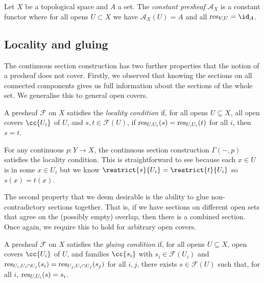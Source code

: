 \documentclass{article}
\begin{document}
\begin{example}
  Let $X$ be a topological space and $A$ a set. The \emph{constant presheaf}
  $\mathscr A_X$ is a constant functor where for all opens $U \subset X$
  we have $\mathscr A_X(U) = A$ and all $\res_{V, U} = \id_A$.
\end{example}

\subsection{Locality and gluing}

The continuous section construction has two further properties that
the notion of a presheaf does not cover. Firstly, we observed that
knowing the sections on all connected components gives us full
information about the sections of the whole set. We generalise this to
general open covers.

\begin{definition}
  A presheaf $\mathscr F$ on $X$ satisfies the \emph{locality condition}
  if, for all opens $U\subseteq X$, all open covers $\cc{U_i}$ of $U$,
  and $s,t\in\mathscr F(U)$, if $\operatorname{res}_{U,U_i}(s) = \operatorname{res}_{U,U_i}(t)$ for all $i$,
  then $s=t$.
\end{definition}

\begin{example}
  For any continuous $p:Y\to X$, the continuous section
  construction $\Gamma(-,p)$ satisfies the locality condition.
  This is straightforward to see because each $x\in U$ is in
  some $x\in U_i$ but we know $\restrict{s}{U_i}=\restrict{t}{U_i}$
  so $s(x) = t(x)$.
\end{example}

The second property that we deem desirable is the ability to glue
non-contradictory sections together. That is, if we have sections
on different open sets that agree on the (possibly empty) overlap,
then there is a combined section. Once again, we require this to
hold for arbitrary open covers.

\begin{definition}\label{def:gluing}
  A presheaf $\mathscr F$ on $X$ satisfies the \emph{gluing condition}
  if, for all opens $U\subseteq X$, open covers $\cc{U_i}$ of $U$,
  and families $\cc{s_i}$ with $s_i\in\mathscr F(U_i)$ and
  $\operatorname{res}_{U_i,U_i\cap U_j}(s_i) = \operatorname{res}_{U_j,U_i\cap U_j}(s_j)$
  for all $i,j$, there exists $s\in\mathscr F(U)$ such that,
  for all $i$, $\operatorname{res}_{U,U_i}(s) = s_i$.
\end{definition}
\end{document}
